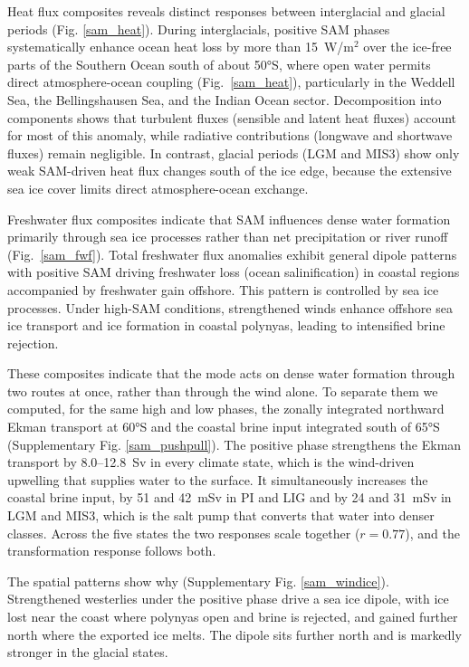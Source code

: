 \documentclass[pdflatex,sn-nature]{sn-jnl}
\begin{document}
Heat flux composites reveals  distinct responses between interglacial and glacial periods (Fig. \ref{sam_heat}). During interglacials, positive SAM phases systematically enhance ocean heat loss by more than 15~W/m$^2$ over the ice-free parts of the Southern Ocean south of about 50°S, where open water permits direct atmosphere-ocean coupling  (Fig.~\ref{sam_heat}), particularly in the Weddell Sea, the Bellingshausen Sea, and the Indian Ocean sector. Decomposition into components shows that turbulent fluxes (sensible and latent heat fluxes) account for most of this anomaly, while radiative contributions (longwave and shortwave fluxes) remain negligible.  In contrast, glacial periods (LGM and MIS3) show only weak SAM-driven heat flux changes south of the ice edge, because the extensive sea ice cover limits direct atmosphere-ocean exchange.


Freshwater flux composites indicate that SAM influences dense water formation primarily through sea ice processes rather than net precipitation or river runoff (Fig.~\ref{sam_fwf}). Total freshwater flux anomalies exhibit general dipole patterns with positive SAM driving freshwater loss (ocean salinification) in coastal regions accompanied by freshwater gain offshore. This pattern is controlled by sea ice processes. Under high-SAM conditions, strengthened winds enhance offshore sea ice transport and ice formation in coastal polynyas, leading to intensified brine rejection.

These composites indicate that the mode acts on dense water formation through two routes at once, rather than through the wind alone. To separate them we computed, for the same high and low phases, the zonally integrated northward Ekman transport at 60°S and the coastal brine input integrated south of 65°S (Supplementary Fig. \ref{sam_pushpull}). The positive phase strengthens the Ekman transport by 8.0--12.8~Sv in every climate state, which is the wind-driven upwelling that supplies water to the surface. It simultaneously increases the coastal brine input, by 51 and 42~mSv in PI and LIG and by 24 and 31~mSv in LGM and MIS3, which is the salt pump that converts that water into denser classes. Across the five states the two responses scale together ($r = 0.77$), and the transformation response follows both.

The spatial patterns show why (Supplementary Fig. \ref{sam_windice}). Strengthened westerlies under the positive phase drive a sea ice dipole, with ice lost near the coast where polynyas open and brine is rejected, and gained further north where the exported ice melts. The dipole sits further north and is markedly stronger in the glacial states.
\end{document}
